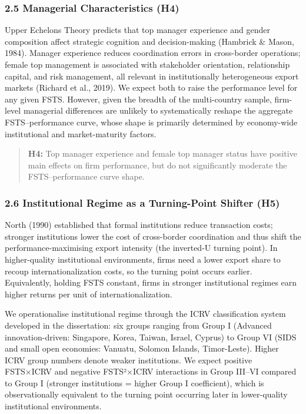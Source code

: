 \documentclass[12pt,a4paper]{article}
\begin{document}
\hypertarget{25-managerial-characteristics-h4}{%
\subsubsection{2.5 Managerial Characteristics
(H4)}\label{25-managerial-characteristics-h4}}

Upper Echelons Theory predicts that top manager experience and gender
composition affect strategic cognition and decision-making (Hambrick \&
Mason, 1984). Manager experience reduces coordination errors in
cross-border operations; female top management is associated with
stakeholder orientation, relationship capital, and risk management, all
relevant in institutionally heterogeneous export markets (Richard et
al., 2019). We expect both to raise the performance level for any given
FSTS. However, given the breadth of the multi-country sample, firm-level
managerial differences are unlikely to systematically reshape the
aggregate FSTS--performance curve, whose shape is primarily determined
by economy-wide institutional and market-maturity factors.

\begin{quote}
\textbf{H4:} Top manager experience and female top manager status have
positive main effects on firm performance, but do not significantly
moderate the FSTS--performance curve shape.
\end{quote}

\hypertarget{26-institutional-regime-as-a-turning-point-shifter-h5}{%
\subsubsection{2.6 Institutional Regime as a Turning-Point Shifter
(H5)}\label{26-institutional-regime-as-a-turning-point-shifter-h5}}

North (1990) established that formal institutions reduce transaction
costs; stronger institutions lower the cost of cross-border coordination
and thus shift the performance-maximising export intensity (the
inverted-U turning point). In higher-quality institutional environments,
firms need a lower export share to recoup internationalization costs, so
the turning point occurs earlier. Equivalently, holding FSTS constant,
firms in stronger institutional regimes earn higher returns per unit of
internationalization.

We operationalise institutional regime through the ICRV classification
system developed in the dissertation: six groups ranging from Group I
(Advanced innovation-driven: Singapore, Korea, Taiwan, Israel, Cyprus)
to Group VI (SIDS and small open economies: Vanuatu, Solomon Islands,
Timor-Leste). Higher ICRV group numbers denote weaker institutions. We
expect positive FSTS×ICRV and negative FSTS²×ICRV interactions in Group
III--VI compared to Group I (stronger institutions = higher Group I
coefficient), which is observationally equivalent to the turning point
occurring later in lower-quality institutional environments.
\end{document}
